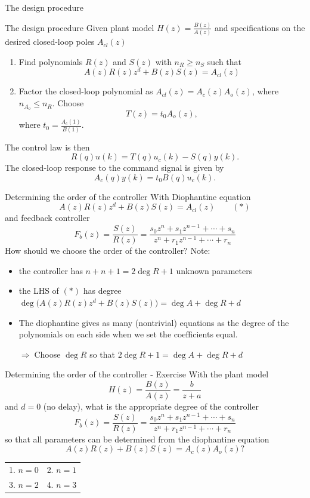 \documentclass[presentation,aspectratio=169]{beamer}
\begin{document}
\begin{frame}[label={sec:orgc5e3dd4}]{The design procedure}
\end{frame}
\begin{frame}[label={sec:org6ac9682}]{The design procedure}
Given plant model \(H(z)=\frac{B(z)}{A(z)}\) and specifications on the desired closed-loop poles \(A_{cl}(z)\)
\begin{enumerate}
\item Find polynomials \(R(z)\) and \(S(z)\) with \(n_R \ge n_S\) such that 
\[ A(z)R(z)z^{d} + B(z)S(z) = A_{cl}(z) \]
\item Factor the closed-loop polynomial as \(A_{cl}(z) = A_c(z)A_o(z)\), where \(n_{A_o} \le n_R\). Choose
\[T(z) = t_0 A_o(z),\] where \(t_0 = \frac{A_c(1)}{B(1)}\).
\end{enumerate}

The control law is then
\[ R(q) u(k) = T(q)u_c(k) - S(q)y(k). \]
The closed-loop response to the command signal is given by
\[ A_c(q)y(k) = t_0 B(q) u_c(k). \]
\end{frame}
\begin{frame}[label={sec:orgaf12c0c}]{Determining the order of the controller}
With Diophantine equation 
   \[ A(z)R(z)z^{d} + B(z)S(z) = A_{cl}(z) \qquad (*) \]
and feedback controller
\[F_b(z) = \frac{S(z)}{R(z)} = \frac{s_0z^n + s_1z^{n-1} + \cdots + s_n}{z^n + r_1 z^{n-1} + \cdots + r_n}\]
\alert{How should we choose the order of the controller?} Note:
\begin{itemize}
\item the controller has \(n+n+1 = 2\deg R + 1\) unknown parameters
\item the LHS of \((*)\) has degree \(\deg \big(A(z)R(z)z^d + B(z)S(z)\big) = \deg A + \deg R + d\)
\item The diophantine gives as many (nontrivial) equations as the degree of the polynomials on each side when we set the coefficients equal.

\alert{\(\Rightarrow\;\)Choose \(\deg R\) so that \(2\deg R + 1 = \deg A + \deg R + d\)}
\end{itemize}
\end{frame}


\begin{frame}[label={sec:org2871584}]{Determining the order of the controller - Exercise}
With the plant model \[H(z) = \frac{B(z)}{A(z)} = \frac{b}{z + a}\] and \(d=0\) (no delay), what is the appropriate degree of the controller 
\[F_b(z) = \frac{S(z)}{R(z)} = \frac{s_0z^n + s_1z^{n-1} + \cdots + s_n}{z^n + r_1 z^{n-1} + \cdots + r_n}\]
so that all parameters can be determined from the diophantine equation
\[ A(z)R(z) + B(z)S(z) = A_c(z)A_o(z)?\]
\begin{center}
\begin{tabular}{ll}
1. \(n = 0\) & 2. \(n = 1\)\\
3. \(n=2\) & 4. \(n=3\)\\
\end{tabular}
\end{center}
\end{frame}
\end{document}
